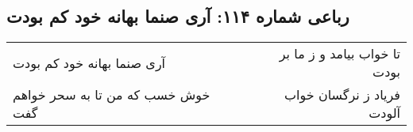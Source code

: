 \begin{center}
\section*{رباعی شماره ۱۱۴: آری صنما بهانه خود کم بودت}
\label{sec:0114}
\begin{longtable}{l p{0.5cm} r}
آری صنما بهانه خود کم بودت
&&
تا خواب بیامد و ز ما بر بودت
\\
خوش خسب که من تا به سحر خواهم گفت
&&
فریاد ز نرگسان خواب آلودت
\\
\end{longtable}
\end{center}

